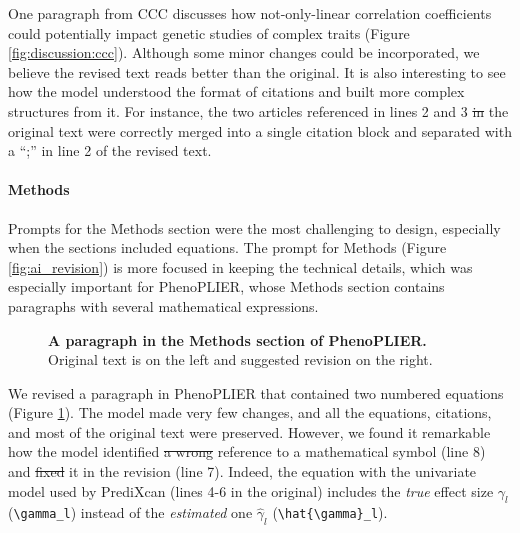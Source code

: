 \documentclass[
]{article}
\providecommand{\DIFaddtex}[1]{{\protect\color{blue}\uwave{#1}}} %
\providecommand{\DIFdeltex}[1]{{\protect\color{red}\sout{#1}}}                      %
\providecommand{\DIFaddbegin}{} %
\providecommand{\DIFaddend}{} %
\providecommand{\DIFdelbegin}{} %
\providecommand{\DIFdelend}{} %
\providecommand{\DIFadd}[1]{\texorpdfstring{\DIFaddtex{#1}}{#1}} %
\providecommand{\DIFdel}[1]{\texorpdfstring{\DIFdeltex{#1}}{}} %
\newcommand{\DIFscaledelfig}{0.5}
\newlength{\DIFdelgraphicswidth} %
\newlength{\DIFdelgraphicsheight} %
\newcommand{\DIFaddincludegraphics}[2][]{{\color{blue}\fbox{\DIFOincludegraphics[#1]{#2}}}} %
\newcommand{\DIFdelincludegraphics}[2][]{%
\sbox{\DIFdelgraphicsbox}{\DIFOincludegraphics[#1]{#2}}%
\settoboxwidth{\DIFdelgraphicswidth}{\DIFdelgraphicsbox} %
\settoboxtotalheight{\DIFdelgraphicsheight}{\DIFdelgraphicsbox} %
\scalebox{\DIFscaledelfig}{%
\parbox[b]{\DIFdelgraphicswidth}{\usebox{\DIFdelgraphicsbox}\\[-\baselineskip] \rule{\DIFdelgraphicswidth}{0em}}\llap{\resizebox{\DIFdelgraphicswidth}{\DIFdelgraphicsheight}{%
\setlength{\unitlength}{\DIFdelgraphicswidth}%
\begin{picture}(1,1)%
\thicklines\linethickness{2pt} %
{\color[rgb]{1,0,0}\put(0,0){\framebox(1,1){}}}%
{\color[rgb]{1,0,0}\put(0,0){\line( 1,1){1}}}%
{\color[rgb]{1,0,0}\put(0,1){\line(1,-1){1}}}%
\end{picture}%
}\hspace*{3pt}}} %
} %
\DeclareRobustCommand{\DIFaddbegin}{\DIFOaddbegin \let\includegraphics\DIFaddincludegraphics} %
\DeclareRobustCommand{\DIFaddend}{\DIFOaddend \let\includegraphics\DIFOincludegraphics} %
\DeclareRobustCommand{\DIFdelbegin}{\DIFOdelbegin \let\includegraphics\DIFdelincludegraphics} %
\DeclareRobustCommand{\DIFdelend}{\DIFOaddend \let\includegraphics\DIFOincludegraphics} %
\begin{document}
One paragraph from CCC discusses how not-only-linear correlation coefficients could potentially impact genetic studies of complex traits (Figure \ref{fig:discussion:ccc}).
Although some minor changes could be incorporated, we believe the revised text reads better than the original.
It is also interesting to see how the model understood the format of citations and built more complex structures from it.
For instance, the two articles referenced in lines 2 and 3 \DIFdelbegin \DIFdel{in }\DIFdelend \DIFaddbegin \DIFadd{of }\DIFaddend the original text were correctly merged into a single citation block and separated with a ``;'' in line 2 of the revised text.

\paragraph{Methods}

Prompts for the Methods section were the most challenging to design, especially when the sections included equations.
The prompt for Methods (Figure \ref{fig:ai_revision}) is more focused in keeping the technical details, which was especially important for PhenoPLIER, whose Methods section contains paragraphs with several mathematical expressions.

\begin{figure}
\hypertarget{fig:methods:phenoplier}{%
\centering

\caption{\textbf{A paragraph in the Methods section of PhenoPLIER.}
Original text is on the left and suggested revision on the right.}\label{fig:methods:phenoplier}
}
\end{figure}

We revised a paragraph in PhenoPLIER that contained two numbered equations (Figure \ref{fig:methods:phenoplier}).
The model made very few changes, and all the equations, citations, and most of the original text were preserved.
However, we found it remarkable how the model identified \DIFdelbegin \DIFdel{a wrong }\DIFdelend \DIFaddbegin \DIFadd{an incorrect }\DIFaddend reference to a mathematical symbol (line 8) and \DIFdelbegin \DIFdel{fixed }\DIFdelend \DIFaddbegin \DIFadd{corrected }\DIFaddend it in the revision (line 7).
Indeed, the equation with the univariate model used by PrediXcan (lines 4-6 in the original) includes the \emph{true} effect size \(\gamma_l\) (\texttt{\textbackslash{}gamma\_l}) instead of the \emph{estimated} one \(\hat{\gamma}_l\) (\texttt{\textbackslash{}hat\{\textbackslash{}gamma\}\_l}).
\end{document}

